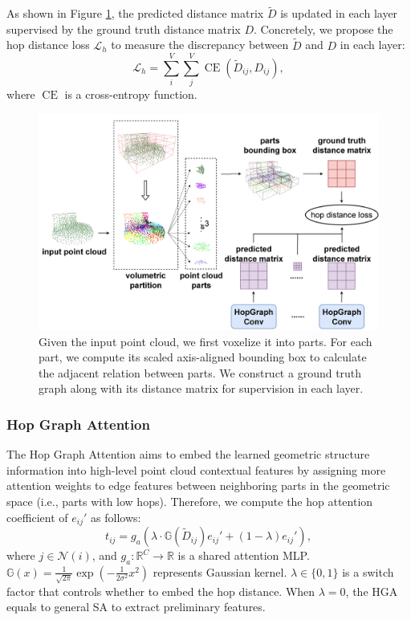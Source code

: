 \documentclass[letterpaper]{article}
\begin{document}
As shown in Figure \ref{fig:hop_distance}, the predicted distance matrix \(\tilde{D}\) is updated in each layer supervised by the ground truth distance matrix \(D\).
Concretely, we propose the hop distance loss \(\mathcal{L}_h\) to measure the discrepancy between \(\tilde{D}\) and \(D\) in each layer:
\begin{equation}
\mathcal{L}_h = \sum_{i}^{V} \sum_{j}^{V} \operatorname{CE}(\tilde{D}_{i j}, D_{i j}),
\end{equation}
where \(\operatorname{CE}\) is a cross-entropy function.


\begin{figure}[!h]
\centering
\begin{minipage}[b]{1.0\linewidth}
\begin{center}
\includegraphics[width=1.0\linewidth]{images/hop_distance.jpg}
\end{center}
\end{minipage}
\caption{
Given the input point cloud, we first voxelize it into parts.
For each part, we compute its scaled axis-aligned bounding box to calculate the adjacent relation between parts. We construct a ground truth graph along with its distance matrix for supervision in each layer.
}
\label{fig:hop_distance}
\end{figure}

\subsubsection{Hop Graph Attention}
The Hop Graph Attention aims to embed the learned geometric structure information into high-level point cloud contextual features by assigning more attention weights to edge features between neighboring parts in the geometric space (i.e., parts with low hops).
Therefore, we compute the hop attention coefficient of \(e_{i j}'\) as follows:
\begin{equation}
t_{i j} = g_a\left( \lambda \cdot \mathbb{G}(\tilde{D}_{ij}) e_{ij}' + (1-\lambda)  e_{ij}' \right),
\end{equation}
where \(j \in \mathcal{N}(i)\), and \(g_a : \mathbb{R}^{C} \rightarrow \mathbb{R}\) is a shared attention MLP.  \(\mathbb{G}(x) = \frac{1}{\sqrt{2 \pi}} \exp \left(-\frac{1}{2 \sigma ^2} x^2\right)\) represents Gaussian kernel.
\(\lambda \in  \{0,1\}\) is a switch factor that controls whether to embed the hop distance. When \(\lambda=0\), the HGA equals to general SA to extract preliminary features.
\end{document}
